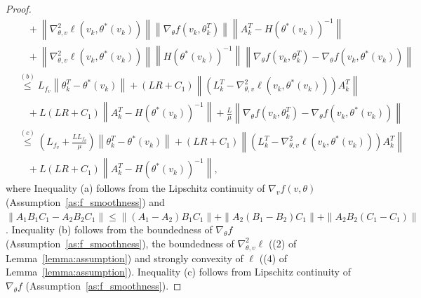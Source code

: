 \documentclass[11 pt]{article}
\begin{document}
\begin{proof}
\begin{align}
    &\quad + \left\|\nabla_{\theta,v}^2\ell(v_k,\theta^*(v_k))\right\| \left\| \nabla_\theta f(v_k,\theta_k^T)\right\|\left\|  A_k^T -  H(\theta^*(v_k))^{-1}\right\|\nonumber\\
    &\quad +\left\|\nabla_{\theta,v}^2\ell(v_k,\theta^*(v_k))\right\| \left\|H(\theta^*(v_k))^{-1} \right\| \left\|    \nabla_\theta f(v_k,\theta_k^T) - \nabla_\theta f(v_k,\theta^*(v_k))\right\|\nonumber\\
     &\overset{(b)}{\leq} L_{f_v} \left\| \theta_k^T - \theta^*(v_k) \right\| + (LR+C_1)\left \|\left(L_k^T - \nabla_{\theta,v}^2\ell(v_k,\theta^*(v_k))
    \right) A_k^T \right\|\nonumber\\
    &\quad +L(LR+C_1) \left\| A_k^T -  H(\theta^*(v_k))^{-1} \right\|  +  \frac{L}{\mu} \left\| \nabla_\theta f(v_k,\theta_k^T) - \nabla_\theta f(v_k,\theta^*(v_k))\right\|\nonumber\\
    & \overset{(c)}{\leq} \left(L_{f_v}+\frac{LL_{f_\theta}}{\mu} \right)\left\| \theta_k^T-\theta^*(v_k) \right\| + (LR+C_1)\left \|\left(L_k^T - \nabla_{\theta,v}^2\ell(v_k,\theta^*(v_k))
    \right) A_k^T \right\| \nonumber\\
    &\quad+  L(LR+C_1) \left\| A_k^T -  H(\theta^*(v_k))^{-1} \right\|\nonumber,
\end{align}
where Inequality (a) follows from the Lipschitz continuity of $\nabla_v f(v,\theta)$ (Assumption~\ref{as:f_smoothness}) and $\|A_1B_1C_1-A_2B_2C_1\|\leq \|(A_1-A_2)B_1C_1\|+\|A_2(B_1-B_2)C_1\|+\|A_2B_2(C_1-C_1)\|$. Inequality (b) follows from the boundedness of $\nabla_\theta f$ (Assumption~\ref{as:f_smoothness}), the boundedness of $\nabla_{\theta,v}^2\ell$ ((2) of Lemma~\ref{lemma:assumption}) and strongly convexity of $\ell$ ((4) of Lemma~\ref{lemma:assumption}). Inequality (c) follows from Lipschitz continuity of $\nabla_\theta f$ (Assumption~\ref{as:f_smoothness}).
\end{proof}
\end{document}
